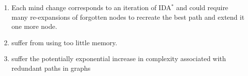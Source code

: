 \begin{enumerate}[itemsep=0.2cm]
\begin{enumerate}
        \item Each mind change corresponds to an iteration of IDA$^\ast$ and could require many re-expansions of forgotten nodes to recreate the best path and extend it one more node.
        \hfill \cite{ai/book/Artificial-Intelligence-A-Modern-Approach/Russell-Norvig}

        \item suffer from using too little memory.
        \hfill \cite{ai/book/Artificial-Intelligence-A-Modern-Approach/Russell-Norvig}

        \item suffer the potentially exponential increase in complexity associated with redundant paths in graphs
        \hfill \cite{ai/book/Artificial-Intelligence-A-Modern-Approach/Russell-Norvig}
    \end{enumerate}
\end{enumerate}


\vspace{0.5cm}

